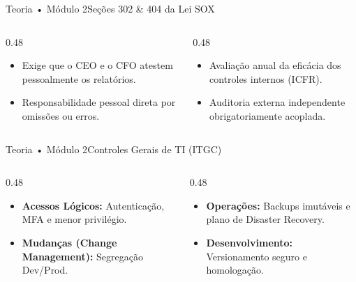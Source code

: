\begin{senaiframe}{Teoria • Módulo 2}{Seções 302 \& 404 da Lei SOX}
  \begin{columns}[t]
    \begin{column}{0.48\textwidth}
      \begin{tcolorbox}[senaibluecard, title={Seção 302 (Assinatura Executiva)}]
        \begin{itemize}
          \item Exige que o CEO e o CFO atestem pessoalmente os relatórios.
          \item Responsabilidade pessoal direta por omissões ou erros.
        \end{itemize}
      \end{tcolorbox}
    \end{column}
    \begin{column}{0.48\textwidth}
      \begin{tcolorbox}[senairedcard, title={Seção 404 (Controles Internos)}]
        \begin{itemize}
          \item Avaliação anual da eficácia dos controles internos (ICFR).
          \item Auditoria externa independente obrigatoriamente acoplada.
        \end{itemize}
      \end{tcolorbox}
    \end{column}
  \end{columns}
\end{senaiframe}

\begin{senaiframe}{Teoria • Módulo 2}{Controles Gerais de TI (ITGC)}
  \begin{columns}[t]
    \begin{column}{0.48\textwidth}
      \begin{tcolorbox}[senaibluecard, title={Acessos \& Mudanças}]
        \begin{itemize}
          \item \textbf{Acessos Lógicos:} Autenticação, MFA e menor privilégio.
          \item \textbf{Mudanças (Change Management):} Segregação Dev/Prod.
        \end{itemize}
      \end{tcolorbox}
    \end{column}
    \begin{column}{0.48\textwidth}
      \begin{tcolorbox}[senaiambercard, title={Operações \& Desenvolvimento}]
        \begin{itemize}
          \item \textbf{Operações:} Backups imutáveis e plano de Disaster Recovery.
          \item \textbf{Desenvolvimento:} Versionamento seguro e homologação.
        \end{itemize}
      \end{tcolorbox}
    \end{column}
  \end{columns}
\end{senaiframe}

